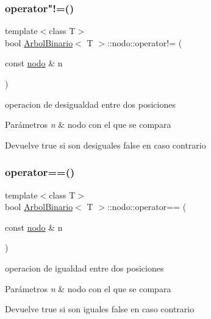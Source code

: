 \subsubsection{\texorpdfstring{operator"!=()}{operator!=()}}
{\footnotesize\ttfamily template$<$class T$>$ \\
bool \hyperlink{classArbolBinario}{Arbol\+Binario}$<$ T $>$\+::nodo\+::operator!= (\begin{DoxyParamCaption}\item[{const \hyperlink{classArbolBinario_1_1nodo}{nodo} \&}]{n }\end{DoxyParamCaption})\hspace{0.3cm}{\ttfamily [inline]}}



operacion de desigualdad entre dos posiciones 


\begin{DoxyParams}{Parámetros}
{\em n} & nodo con el que se compara \\
\hline
\end{DoxyParams}
\begin{DoxyReturn}{Devuelve}
true si son desiguales false en caso contrario 
\end{DoxyReturn}
\mbox{\label{classArbolBinario_1_1nodo_a02dfaed2a589195911bc8e75bd97d298}} 
\subsubsection{\texorpdfstring{operator==()}{operator==()}}
{\footnotesize\ttfamily template$<$class T$>$ \\
bool \hyperlink{classArbolBinario}{Arbol\+Binario}$<$ T $>$\+::nodo\+::operator== (\begin{DoxyParamCaption}\item[{const \hyperlink{classArbolBinario_1_1nodo}{nodo} \&}]{n }\end{DoxyParamCaption})\hspace{0.3cm}{\ttfamily [inline]}}



operacion de igualdad entre dos posiciones 


\begin{DoxyParams}{Parámetros}
{\em n} & nodo con el que se compara \\
\hline
\end{DoxyParams}
\begin{DoxyReturn}{Devuelve}
true si son iguales false en caso contrario 
\end{DoxyReturn}
\mbox{\label{classArbolBinario_1_1nodo_a78b4d51bc9bd22f16a70c8e2bee3fef1}} 
